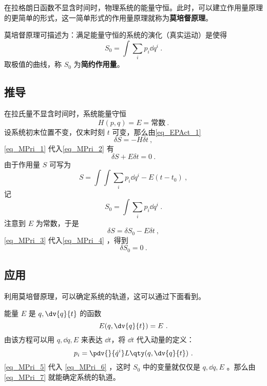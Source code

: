 在拉格朗日函数不显含时间时，物理系统的能量守恒。此时，可以建立作用量原理的更简单的形式，这一简单形式的作用量原理就称为\textbf{莫培督原理}。

莫培督原理可描述为：满足能量守恒的系统的演化（真实运动）是使得
\begin{equation}
S_0=\int\sum_i p_i\dd q^i~.
\end{equation}
取极值的曲线，称 $S_0$ 为\textbf{简约作用量}。
\subsection{推导}
在拉氏量不显含时间时，系统能量守恒
\begin{equation}\label{eq_MPri_1}
H(p,q)=E=\text{常数}~.
\end{equation}
设系统初末位置不变，仅末时刻 $t$ 可变，那么由\autoref{eq_EPAct_1}~
\begin{equation}\label{eq_MPri_2}
\delta S=-H\delta t~,
\end{equation}
\autoref{eq_MPri_1} 代入\autoref{eq_MPri_2} 有
\begin{equation}\label{eq_MPri_4}
\delta S+E\delta t=0~.
\end{equation}
由于作用量 $S$ 可写为
\begin{equation}
S=\int \int\sum_i p_i\dd q^i-E(t-t_0)~,
\end{equation}
记
\begin{equation}\label{eq_MPri_6}
S_0=\int\sum_i p_i\dd q^i~.
\end{equation}
注意到 $E$ 为常数，于是
\begin{equation}\label{eq_MPri_3}
\delta S=\delta S_0-E\delta t~,
\end{equation}
\autoref{eq_MPri_3} 代入\autoref{eq_MPri_4} ，得到
\begin{equation}\label{eq_MPri_7}
\delta S_0=0~.
\end{equation}
\subsection{应用}
利用莫培督原理，可以确定系统的轨道，这可以通过下面看到。

能量 $E$ 是 $q,\dv{q}{t}$ 的函数 
\begin{equation}
E(q,\dv{q}{t})=E~.
\end{equation}
由该方程可以用 $q,\dd q,E$ 来表达 $\dd t$，将 $\dd t$ 代入动量的定义：
\begin{equation}\label{eq_MPri_5}
p_i=\pdv{}{\dot q^i}L\qty(q,\dv{q}{t})~.
\end{equation}
\autoref{eq_MPri_5} 代入 \autoref{eq_MPri_6} ，这时 $S_0$ 中的变量就仅仅是 $q,\dd q, E$ 。那么由\autoref{eq_MPri_7} 就能确定系统的轨道。